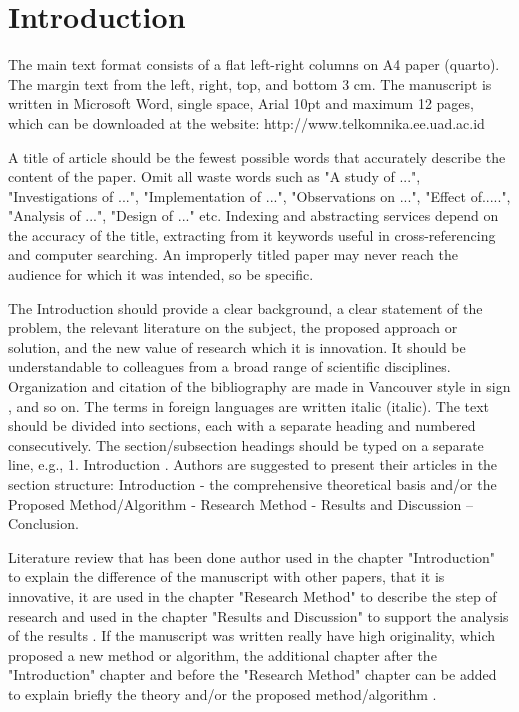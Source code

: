 \documentclass{iaesarticle3ol}
\begin{document}
\section{Introduction}
\label{}
The main text format consists of a flat left-right columns on A4 paper (quarto). The margin text from the left, right, top, and bottom 3 cm. The manuscript is written in Microsoft Word, single space, Arial 10pt and maximum 12 pages, which can be downloaded at the website: http://www.telkomnika.ee.uad.ac.id
\par
A title of article should be the fewest possible words that accurately describe the content of the paper. Omit all waste words such as "A study of ...", "Investigations of ...", "Implementation of ...", "Observations on ...", "Effect of.....", "Analysis of ...", "Design of ..." etc. Indexing and abstracting services depend on the accuracy of the title, extracting from it keywords useful in cross-referencing and computer searching. An improperly titled paper may never reach the audience for which it was intended, so be specific.
\par
The Introduction should provide a clear background, a clear statement of the problem, the relevant literature on the subject, the proposed approach or solution, and the new value of research which it is innovation. It should be understandable to colleagues from a broad range of scientific disciplines. Organization and citation of the bibliography are made in Vancouver style in sign \cite{Li}, \cite{Arulmozhiyal} and so on. The terms in foreign languages are written italic (italic). The text should be divided into sections, each with a separate heading and numbered consecutively. The section/subsection headings should be typed on a separate line, e.g., 1. Introduction \cite{Zhang}. Authors are suggested to present their articles in the section structure: Introduction - the comprehensive theoretical basis and/or the Proposed Method/Algorithm - Research Method - Results and Discussion – Conclusion.
\par
Literature review that has been done author used in the chapter "Introduction" to explain the difference of the manuscript with other papers, that it is innovative, it are used in the chapter "Research Method" to describe the step of research and used in the chapter "Results and Discussion" to support the analysis of the results \cite{Arulmozhiyal}. If the manuscript was written really have high originality, which proposed a new method or algorithm, the additional chapter after the "Introduction" chapter and before the "Research Method" chapter can be added to explain briefly the theory and/or the proposed method/algorithm \cite{Zhang}.
\end{document}
